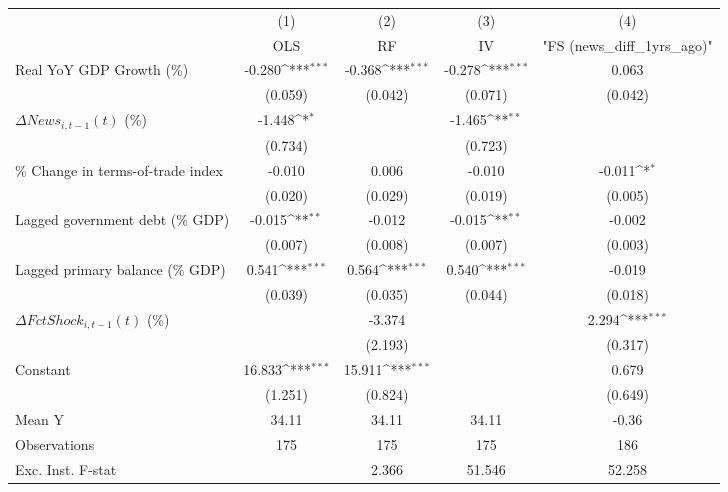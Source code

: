 {
\def\sym#1{\ifmmode^{#1}\else\(^{#1}\)\fi}
\begin{tabular}{l*{4}{c}}
\toprule
                    &\multicolumn{1}{c}{(1)}&\multicolumn{1}{c}{(2)}&\multicolumn{1}{c}{(3)}&\multicolumn{1}{c}{(4)}\\
                    &\multicolumn{1}{c}{OLS}&\multicolumn{1}{c}{RF}&\multicolumn{1}{c}{IV}&\multicolumn{1}{c}{ "FS (news_diff_1yrs_ago)" }\\
\midrule
Real YoY GDP Growth (\%)&      -0.280\sym{***}&      -0.368\sym{***}&      -0.278\sym{***}&       0.063         \\
                    &     (0.059)         &     (0.042)         &     (0.071)         &     (0.042)         \\
\addlinespace
$ \Delta News_{i,t-1}(t)$ (\%)&      -1.448\sym{*}  &                     &      -1.465\sym{**} &                     \\
                    &     (0.734)         &                     &     (0.723)         &                     \\
\addlinespace
\% Change in terms-of-trade index&      -0.010         &       0.006         &      -0.010         &      -0.011\sym{*}  \\
                    &     (0.020)         &     (0.029)         &     (0.019)         &     (0.005)         \\
\addlinespace
Lagged government debt (\% GDP)&      -0.015\sym{**} &      -0.012         &      -0.015\sym{**} &      -0.002         \\
                    &     (0.007)         &     (0.008)         &     (0.007)         &     (0.003)         \\
\addlinespace
Lagged primary balance (\% GDP)&       0.541\sym{***}&       0.564\sym{***}&       0.540\sym{***}&      -0.019         \\
                    &     (0.039)         &     (0.035)         &     (0.044)         &     (0.018)         \\
\addlinespace
$ \Delta FctShock_{i,t-1}(t)$ (\%)&                     &      -3.374         &                     &       2.294\sym{***}\\
                    &                     &     (2.193)         &                     &     (0.317)         \\
\addlinespace
Constant            &      16.833\sym{***}&      15.911\sym{***}&                     &       0.679         \\
                    &     (1.251)         &     (0.824)         &                     &     (0.649)         \\
\midrule
Mean Y              &       34.11         &       34.11         &       34.11         &       -0.36         \\
Observations        &         175         &         175         &         175         &         186         \\
Exc. Inst. F-stat   &                     &       2.366         &      51.546         &      52.258         \\
\bottomrule
\end{tabular}
}
